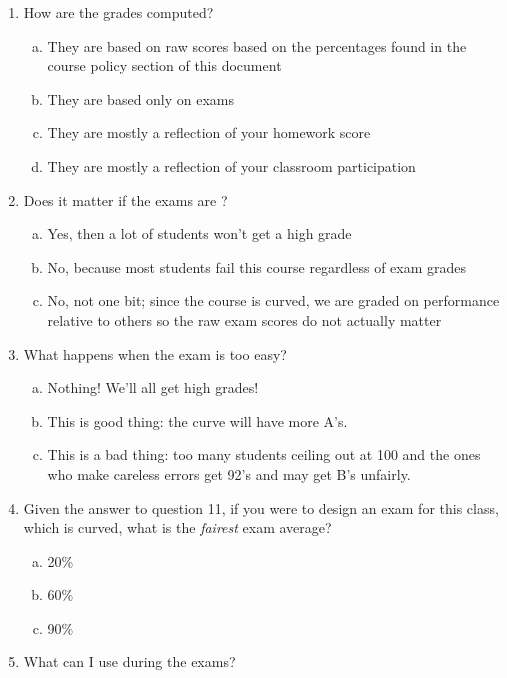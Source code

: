 \begin{enumerate}[1.]
\item How are the grades computed?

\begin{enumerate}[(a)]
\item They are based on raw scores based on the percentages found in the course policy section of this document
\item They are based only on exams
\item They are mostly a reflection of your homework score
\item They are mostly a reflection of your classroom participation
\end{enumerate}


\item Does it matter if the exams are ?

\begin{enumerate}[(a)]
\item Yes, then a lot of students won't get a high grade
\item No, because most students fail this course regardless of exam grades
\item No, not one bit; since the course is curved, we are graded on performance relative to others so the raw exam scores do not actually matter
\end{enumerate}

\item What happens when the exam is too easy? 

\begin{enumerate}[(a)]
\item Nothing! We'll all get high grades!
\item This is good thing: the curve will have more A's.
\item This is a bad thing: too many students ceiling out at 100 and the ones who make careless errors get 92's and may get B's unfairly.
\end{enumerate}

\item Given the answer to question 11, if you were to design an exam for this class, which is curved, what is the \textit{fairest} exam average?

\begin{enumerate}[(a)]
\item 20\%
\item 60\%
\item 90\%
\end{enumerate}

\item What can I use during the exams?


\end{enumerate}
